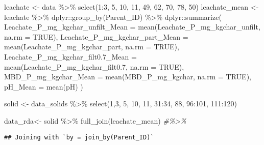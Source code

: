\documentclass[
]{article}
\newenvironment{Shaded}{\begin{snugshade}}{\end{snugshade}}
\newcommand{\AttributeTok}[1]{\textcolor[rgb]{0.77,0.63,0.00}{#1}}
\newcommand{\CommentTok}[1]{\textcolor[rgb]{0.56,0.35,0.01}{\textit{#1}}}
\newcommand{\ConstantTok}[1]{\textcolor[rgb]{0.00,0.00,0.00}{#1}}
\newcommand{\DecValTok}[1]{\textcolor[rgb]{0.00,0.00,0.81}{#1}}
\newcommand{\FloatTok}[1]{\textcolor[rgb]{0.00,0.00,0.81}{#1}}
\newcommand{\FunctionTok}[1]{\textcolor[rgb]{0.00,0.00,0.00}{#1}}
\newcommand{\NormalTok}[1]{#1}
\newcommand{\OtherTok}[1]{\textcolor[rgb]{0.56,0.35,0.01}{#1}}
\newcommand{\SpecialCharTok}[1]{\textcolor[rgb]{0.00,0.00,0.00}{#1}}
\begin{document}
\begin{Shaded}
\begin{Highlighting}[]
\NormalTok{leachate }\OtherTok{\textless{}{-}}\NormalTok{ data }\SpecialCharTok{\%\textgreater{}\%}
  \FunctionTok{select}\NormalTok{(}\DecValTok{1}\SpecialCharTok{:}\DecValTok{3}\NormalTok{, }\DecValTok{5}\NormalTok{, }\DecValTok{10}\NormalTok{, }\DecValTok{11}\NormalTok{, }\DecValTok{49}\NormalTok{, }\DecValTok{62}\NormalTok{, }\DecValTok{70}\NormalTok{, }\DecValTok{78}\NormalTok{, }\DecValTok{50}\NormalTok{)}
\NormalTok{leachate\_mean }\OtherTok{\textless{}{-}}\NormalTok{ leachate }\SpecialCharTok{\%\textgreater{}\%}
\NormalTok{  dplyr}\SpecialCharTok{::}\FunctionTok{group\_by}\NormalTok{(Parent\_ID) }\SpecialCharTok{\%\textgreater{}\%}
\NormalTok{  dplyr}\SpecialCharTok{::}\FunctionTok{summarize}\NormalTok{(}
    \AttributeTok{Leachate\_P\_mg\_kgchar\_unfilt\_Mean =} \FunctionTok{mean}\NormalTok{(Leachate\_P\_mg\_kgchar\_unfilt, }\AttributeTok{na.rm =} \ConstantTok{TRUE}\NormalTok{),}
    \AttributeTok{Leachate\_P\_mg\_kgchar\_part\_Mean =} \FunctionTok{mean}\NormalTok{(Leachate\_P\_mg\_kgchar\_part, }\AttributeTok{na.rm =} \ConstantTok{TRUE}\NormalTok{),}
    \AttributeTok{Leachate\_P\_mg\_kgchar\_filt0.7\_Mean =} \FunctionTok{mean}\NormalTok{(Leachate\_P\_mg\_kgchar\_filt0}\FloatTok{.7}\NormalTok{, }\AttributeTok{na.rm =} \ConstantTok{TRUE}\NormalTok{),}
    \AttributeTok{MBD\_P\_mg\_kgchar\_Mean =} \FunctionTok{mean}\NormalTok{(MBD\_P\_mg\_kgchar, }\AttributeTok{na.rm =} \ConstantTok{TRUE}\NormalTok{),}
    \AttributeTok{pH\_Mean =} \FunctionTok{mean}\NormalTok{(pH)}
\NormalTok{  )}

\NormalTok{solid }\OtherTok{\textless{}{-}}\NormalTok{ data\_solids }\SpecialCharTok{\%\textgreater{}\%}
  \FunctionTok{select}\NormalTok{(}\DecValTok{1}\NormalTok{,}\DecValTok{3}\NormalTok{, }\DecValTok{5}\NormalTok{, }\DecValTok{10}\NormalTok{, }\DecValTok{11}\NormalTok{, }\DecValTok{31}\SpecialCharTok{:}\DecValTok{34}\NormalTok{, }\DecValTok{88}\NormalTok{, }\DecValTok{96}\SpecialCharTok{:}\DecValTok{101}\NormalTok{, }\DecValTok{111}\SpecialCharTok{:}\DecValTok{120}\NormalTok{)}

\NormalTok{data\_rda}\OtherTok{\textless{}{-}}\NormalTok{ solid }\SpecialCharTok{\%\textgreater{}\%}
  \FunctionTok{full\_join}\NormalTok{(leachate\_mean) }\CommentTok{\#\%\textgreater{}\%}
\end{Highlighting}
\end{Shaded}

\begin{verbatim}
## Joining with `by = join_by(Parent_ID)`
\end{verbatim}
\end{document}
